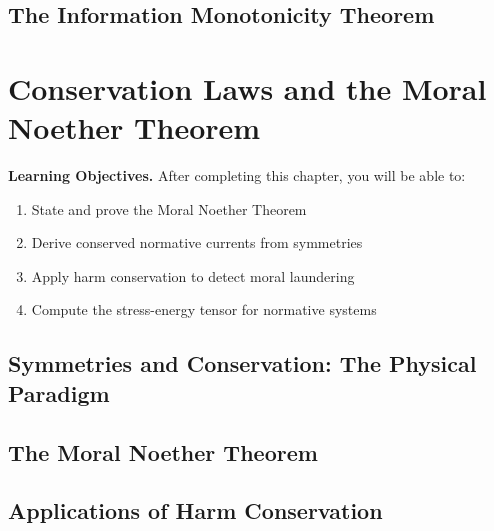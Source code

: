 \documentclass[12pt,letterpaper,twoside,openright]{book}
\theoremstyle{plain}
\theoremstyle{definition}
\theoremstyle{remark}
\begin{document}
\section{The Information Monotonicity Theorem}


\chapter{Conservation Laws and the Moral Noether Theorem}
\label{ch:noether}

\begin{framed}
\noindent\textbf{Learning Objectives.} After completing this chapter, you will be able to:
\begin{enumerate}
    \item State and prove the Moral Noether Theorem
    \item Derive conserved normative currents from symmetries
    \item Apply harm conservation to detect moral laundering
    \item Compute the stress-energy tensor for normative systems
\end{enumerate}
\end{framed}

\section{Symmetries and Conservation: The Physical Paradigm}

\section{The Moral Noether Theorem}

\section{Applications of Harm Conservation}
\end{document}
